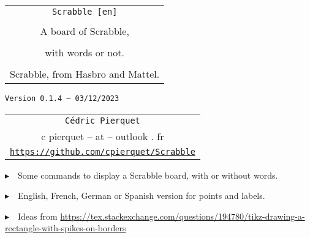 \documentclass{article}
\def\TPversion{0.1.4}
\def\TPdate{03/12/2023}
\begin{document}
\pagestyle{fancy}

\thispagestyle{empty}

\vspace{2cm}

\begin{center}
	\begin{minipage}{0.75\linewidth}
	\begin{tcolorbox}[colframe=yellow,colback=yellow!15]
		\begin{center}
			\begin{tabular}{c}
				{\Huge \texttt{Scrabble [en]}}\\
				\\
				{\LARGE A board of Scrabble,} \\
				\\
				{\LARGE with words or not.} \\
				\\
				{Scrabble\texttrademark{}, from Hasbro\texttrademark{} and Mattel\texttrademark{}.}
			\end{tabular}
			
			\medskip
			
			{\small \texttt{Version \TPversion{} -- \TPdate}}
		\end{center}
	\end{tcolorbox}
\end{minipage}
\end{center}

\vspace{0.5cm}

\begin{center}
	\begin{tabular}{c}
	\texttt{Cédric Pierquet}\\
	{\ttfamily c pierquet -- at -- outlook . fr}\\
	\texttt{\url{https://github.com/cpierquet/Scrabble}}
\end{tabular}
\end{center}

\vspace{0.5cm}

{$\blacktriangleright$~~Some commands to display a Scrabble board, with or without words.}

\smallskip

{$\blacktriangleright$~~English, French, German or Spanish version for points and labels.}

\smallskip

{$\blacktriangleright$~~Ideas from \url{https://tex.stackexchange.com/questions/194780/tikz-drawing-a-rectangle-with-spikes-on-borders}}
\end{document}
